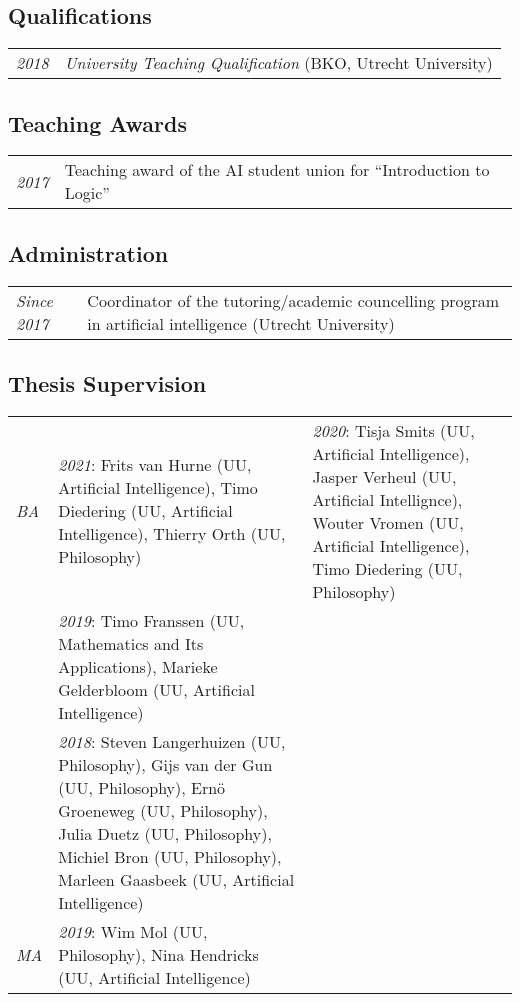 \subsection*{Qualifications}

\begin{tabular}{l p{\linewidth}}
  \emph{2018} & \emph{University Teaching Qualification} (BKO, Utrecht University)
\end{tabular}

\subsection*{Teaching Awards}

\begin{tabular}{p{.1\linewidth} l}
  \emph{2017} & Teaching award of the AI student union for ``Introduction to Logic''
\end{tabular}

\subsection*{Administration}
	
\begin{tabular}{p{.15\linewidth} p{.8\linewidth}}
  \emph{Since 2017} & Coordinator of the tutoring/academic councelling program in artificial intelligence (Utrecht University)\\
\end{tabular}

\subsection*{Thesis Supervision}

\begin{tabular}{p{.1\linewidth} p{.8\linewidth}}
  \emph{BA}  & \emph{2021}: Frits van Hurne (UU, Artificial Intelligence),
                            Timo Diedering (UU, Artificial Intelligence),
                            Thierry Orth (UU, Philosophy)

             & \emph{2020}: Tisja Smits (UU, Artificial Intelligence),
                            Jasper Verheul (UU, Artificial Intellignce),
                            Wouter Vromen (UU, Artificial Intelligence),
                            Timo Diedering (UU, Philosophy)\\
             & \emph{2019}: Timo Franssen (UU, Mathematics and Its
                            Applications), Marieke Gelderbloom (UU, Artificial Intelligence)\\
             & \emph{2018}: Steven Langerhuizen (UU, Philosophy), Gijs van der
                            Gun (UU, Philosophy), Ern\"o Groeneweg (UU, Philosophy), Julia Duetz (UU,
                            Philosophy), Michiel Bron (UU, Philosophy), Marleen Gaasbeek (UU, Artificial
                            Intelligence)\\[1ex]
  \emph{MA}  & \emph{2019}: Wim Mol (UU, Philosophy),
                            Nina Hendricks (UU, Artificial Intelligence)\\
\end{tabular}


